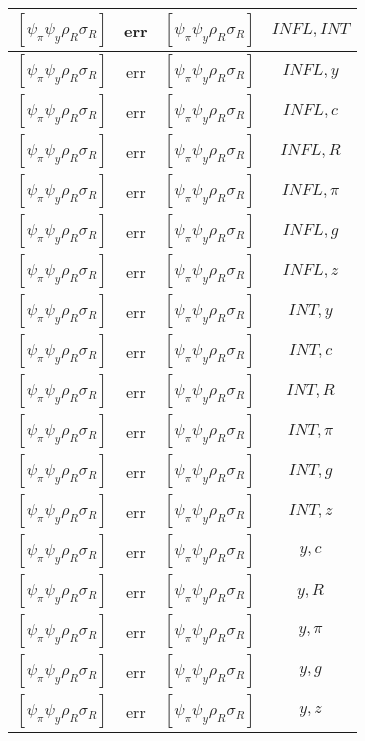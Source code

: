 \documentclass[a4paper,10pt]{article}
\begin{document}
\begin{longtable}{|c|c|c|c|}
\hline
$[\psi_\pi \psi_y \rho_R \sigma_R ]$ & err & $[\psi_\pi \psi_y \rho_R \sigma_R ]$ & ${INFL},{INT}$ \\
\hline
$[\psi_\pi \psi_y \rho_R \sigma_R ]$ & err & $[\psi_\pi \psi_y \rho_R \sigma_R ]$ & ${INFL},{y}$ \\
\hline
$[\psi_\pi \psi_y \rho_R \sigma_R ]$ & err & $[\psi_\pi \psi_y \rho_R \sigma_R ]$ & ${INFL},{c}$ \\
\hline
$[\psi_\pi \psi_y \rho_R \sigma_R ]$ & err & $[\psi_\pi \psi_y \rho_R \sigma_R ]$ & ${INFL},{R}$ \\
\hline
$[\psi_\pi \psi_y \rho_R \sigma_R ]$ & err & $[\psi_\pi \psi_y \rho_R \sigma_R ]$ & ${INFL},{\pi}$ \\
\hline
$[\psi_\pi \psi_y \rho_R \sigma_R ]$ & err & $[\psi_\pi \psi_y \rho_R \sigma_R ]$ & ${INFL},{g}$ \\
\hline
$[\psi_\pi \psi_y \rho_R \sigma_R ]$ & err & $[\psi_\pi \psi_y \rho_R \sigma_R ]$ & ${INFL},{z}$ \\
\hline
$[\psi_\pi \psi_y \rho_R \sigma_R ]$ & err & $[\psi_\pi \psi_y \rho_R \sigma_R ]$ & ${INT},{y}$ \\
\hline
$[\psi_\pi \psi_y \rho_R \sigma_R ]$ & err & $[\psi_\pi \psi_y \rho_R \sigma_R ]$ & ${INT},{c}$ \\
\hline
$[\psi_\pi \psi_y \rho_R \sigma_R ]$ & err & $[\psi_\pi \psi_y \rho_R \sigma_R ]$ & ${INT},{R}$ \\
\hline
$[\psi_\pi \psi_y \rho_R \sigma_R ]$ & err & $[\psi_\pi \psi_y \rho_R \sigma_R ]$ & ${INT},{\pi}$ \\
\hline
$[\psi_\pi \psi_y \rho_R \sigma_R ]$ & err & $[\psi_\pi \psi_y \rho_R \sigma_R ]$ & ${INT},{g}$ \\
\hline
$[\psi_\pi \psi_y \rho_R \sigma_R ]$ & err & $[\psi_\pi \psi_y \rho_R \sigma_R ]$ & ${INT},{z}$ \\
\hline
$[\psi_\pi \psi_y \rho_R \sigma_R ]$ & err & $[\psi_\pi \psi_y \rho_R \sigma_R ]$ & ${y},{c}$ \\
\hline
$[\psi_\pi \psi_y \rho_R \sigma_R ]$ & err & $[\psi_\pi \psi_y \rho_R \sigma_R ]$ & ${y},{R}$ \\
\hline
$[\psi_\pi \psi_y \rho_R \sigma_R ]$ & err & $[\psi_\pi \psi_y \rho_R \sigma_R ]$ & ${y},{\pi}$ \\
\hline
$[\psi_\pi \psi_y \rho_R \sigma_R ]$ & err & $[\psi_\pi \psi_y \rho_R \sigma_R ]$ & ${y},{g}$ \\
\hline
$[\psi_\pi \psi_y \rho_R \sigma_R ]$ & err & $[\psi_\pi \psi_y \rho_R \sigma_R ]$ & ${y},{z}$ \\

\end{longtable}
\end{document}
